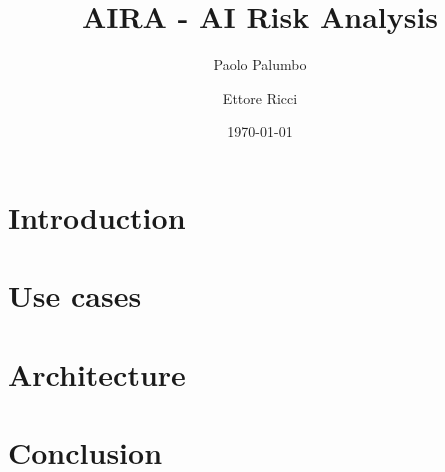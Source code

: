 \documentclass{article}
\title{AIRA - AI Risk Analysis}
\author{Paolo Palumbo \and Ettore Ricci}
\date{\today}
\begin{document}
\maketitle
\tableofcontents
\newpage
\section{Introduction}

\section{Use cases}

\section{Architecture}

\section{Conclusion}

\end{document}
